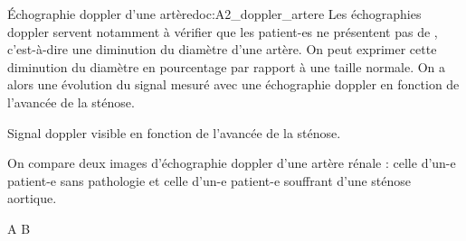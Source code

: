 \begin{doc}{Échographie doppler d'une artère}{doc:A2_doppler_artere}
  Les échographies doppler servent notamment à vérifier que les patient-es ne présentent pas de , c'est-à-dire une diminution du diamètre d'une artère.
  On peut exprimer cette diminution du diamètre en pourcentage par rapport à une taille normale.
  On a alors une évolution du signal mesuré avec une échographie doppler en fonction de l'avancée de la sténose.
  \begin{center}
    
    Signal doppler visible en fonction de l'avancée de la sténose.
  \end{center}

  On compare deux images d'échographie doppler d'une artère rénale : celle d'un-e patient-e sans pathologie et celle d'un-e patient-e souffrant d'une sténose aortique.
  
  \begin{center}
    
    \separationBlocs
    {\centering\faArrowUp\; A}
    {\centering \faArrowUp\; B \hspace{4cm}\phantom{b}}
  \end{center}
\end{doc}


